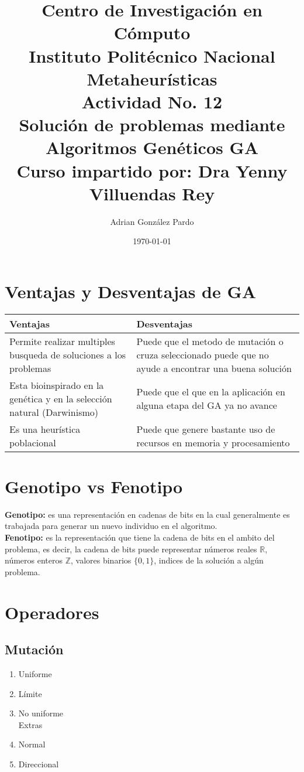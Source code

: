 \documentclass[10pt]{article}
\title{Centro de Investigación en Cómputo\\Instituto Politécnico Nacional\\Metaheurísticas\\Actividad No. 12\\ Solución de problemas mediante Algoritmos Genéticos GA\\Curso impartido por: Dra Yenny Villuendas Rey}
\author{Adrian González Pardo}
\date{\today}
\begin{document}
\maketitle
\section{Ventajas y Desventajas de GA}
\begin{center}
  \begin{tabular}{|p{6cm}|p{6cm}|}
    \hline
    Ventajas & Desventajas \\
    \hline
    Permite realizar multiples busqueda de soluciones a los problemas & Puede que el metodo de mutación o cruza seleccionado puede que no ayude a encontrar una buena solución\\
    \hline
    Esta bioinspirado en la genética y en la selección natural (Darwinismo) & Puede que el que en la aplicación en alguna etapa del GA ya no avance \\
    \hline
    Es una heurística poblacional & Puede que genere bastante uso de recursos en memoria y procesamiento \\
    \hline
  \end{tabular}
\end{center}
\section{Genotipo vs Fenotipo}
\textbf{Genotipo:} es una representación en cadenas de bits en la cual generalmente es trabajada para generar un nuevo individuo en el algoritmo.
\\
\textbf{Fenotipo:} es la representación que tiene la cadena de bits en el ambito del problema, es decir, la cadena de bits puede representar números reales $\mathbb{R}$, números enteros $\mathbb{Z}$, valores binarios $\{0,1\}$, indices de la solución a algún problema.
\section{Operadores}
\subsection{Mutación}
\begin{enumerate}
  \item Uniforme
  \item Límite
  \item No uniforme\\
  Extras
  \item Normal
  \item Direccional
\end{enumerate}
\end{document}
